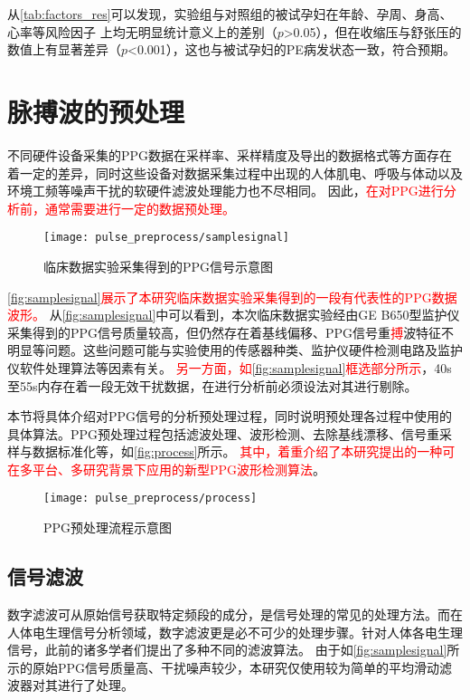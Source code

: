 从\autoref{tab:factors_res}可以发现，实验组与对照组的被试孕妇在年龄、孕周、身高、心率等风险因子
上均无明显统计意义上的差别（$p$>0.05），但在收缩压与舒张压的数值上有显著差异（$p$<0.001），这也与被试孕妇的PE病发状态一致，符合预期。

\section{脉搏波的预处理}
不同硬件设备采集的PPG数据在采样率、采样精度及导出的数据格式等方面存在着一定的差异，同时这些设备对数据采集过程中出现的人体肌电、呼吸与体动以及环境工频等噪声干扰的软硬件滤波处理能力也不尽相同。
因此，\textcolor{red}{在对PPG进行分析前，通常需要进行一定的数据预处理。}

\begin{figure}[htbp]
    \centering
    \texttt{[image: pulse\_preprocess/samplesignal]}
    \caption{\label{fig:samplesignal}临床数据实验采集得到的PPG信号示意图}
\end{figure}

\textcolor{red}{\autoref{fig:samplesignal}展示了本研究临床数据实验采集得到的一段有代表性的PPG数据波形。}
从\autoref{fig:samplesignal}中可以看到，本次临床数据实验经由GE B650型监护仪采集得到的PPG信号质量较高，但仍然存在着基线偏移、PPG信号重\textcolor{red}{搏}波特征不明显等问题。这些问题可能与实验使用的传感器种类、监护仪硬件检测电路及监护仪软件处理算法等因素有关。
\textcolor{red}{另一方面，如\autoref{fig:samplesignal}框选部分所示}，40s至55s内存在着一段无效干扰数据，在进行分析前必须设法对其进行剔除。

本节将具体介绍对PPG信号的分析预处理过程，同时说明预处理各过程中使用的具体算法。PPG预处理过程包括滤波处理、波形检测、去除基线漂移、信号重采样与数据标准化等，如\autoref{fig:process}所示。
\textcolor{red}{其中，着重介绍了本研究提出的一种可在多平台、多研究背景下应用的新型PPG波形检测算法}。
\begin{figure}[htbp]
    \centering
    \texttt{[image: pulse\_preprocess/process]}
    \caption{\label{fig:process}PPG预处理流程示意图}
\end{figure}

\subsection{信号滤波}
数字滤波可从原始信号获取特定频段的成分，是信号处理的常见的处理方法。而在人体电生理信号分析领域，数字滤波更是必不可少的处理步骤。针对人体各电生理信号，此前的诸多学者们提出了多种不同的滤波算法。
由于如\autoref{fig:samplesignal}所示的原始PPG信号质量高、干扰噪声较少，本研究仅使用较为简单的平均滑动滤波器对其进行了处理。

